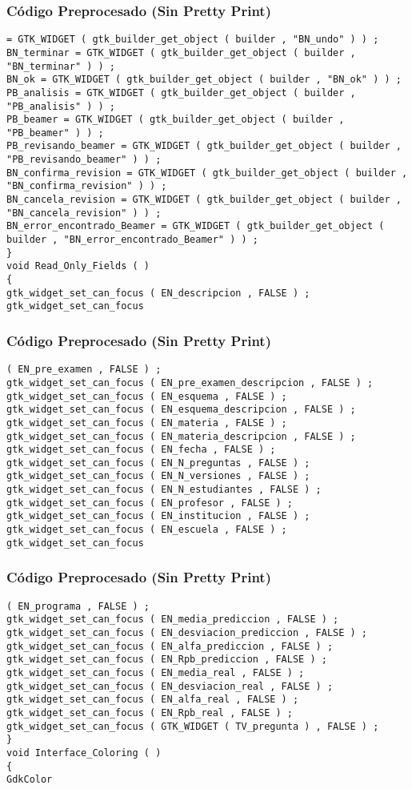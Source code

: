 \documentclass{beamer}
\begin{document}
\begin{frame}[fragile]
\frametitle{C\'odigo Preprocesado (Sin Pretty Print)}
\begin{lstlisting}[style=CStyle]
= GTK_WIDGET ( gtk_builder_get_object ( builder , "BN_undo" ) ) ; 
BN_terminar = GTK_WIDGET ( gtk_builder_get_object ( builder , "BN_terminar" ) ) ; 
BN_ok = GTK_WIDGET ( gtk_builder_get_object ( builder , "BN_ok" ) ) ; 
PB_analisis = GTK_WIDGET ( gtk_builder_get_object ( builder , "PB_analisis" ) ) ; 
PB_beamer = GTK_WIDGET ( gtk_builder_get_object ( builder , "PB_beamer" ) ) ; 
PB_revisando_beamer = GTK_WIDGET ( gtk_builder_get_object ( builder , "PB_revisando_beamer" ) ) ; 
BN_confirma_revision = GTK_WIDGET ( gtk_builder_get_object ( builder , "BN_confirma_revision" ) ) ; 
BN_cancela_revision = GTK_WIDGET ( gtk_builder_get_object ( builder , "BN_cancela_revision" ) ) ; 
BN_error_encontrado_Beamer = GTK_WIDGET ( gtk_builder_get_object ( builder , "BN_error_encontrado_Beamer" ) ) ; 
} 
void Read_Only_Fields ( ) 
{ 
gtk_widget_set_can_focus ( EN_descripcion , FALSE ) ; 
gtk_widget_set_can_focus \end{lstlisting}
\end{frame}
\begin{frame}[fragile]
\frametitle{C\'odigo Preprocesado (Sin Pretty Print)}
\begin{lstlisting}[style=CStyle]
( EN_pre_examen , FALSE ) ; 
gtk_widget_set_can_focus ( EN_pre_examen_descripcion , FALSE ) ; 
gtk_widget_set_can_focus ( EN_esquema , FALSE ) ; 
gtk_widget_set_can_focus ( EN_esquema_descripcion , FALSE ) ; 
gtk_widget_set_can_focus ( EN_materia , FALSE ) ; 
gtk_widget_set_can_focus ( EN_materia_descripcion , FALSE ) ; 
gtk_widget_set_can_focus ( EN_fecha , FALSE ) ; 
gtk_widget_set_can_focus ( EN_N_preguntas , FALSE ) ; 
gtk_widget_set_can_focus ( EN_N_versiones , FALSE ) ; 
gtk_widget_set_can_focus ( EN_N_estudiantes , FALSE ) ; 
gtk_widget_set_can_focus ( EN_profesor , FALSE ) ; 
gtk_widget_set_can_focus ( EN_institucion , FALSE ) ; 
gtk_widget_set_can_focus ( EN_escuela , FALSE ) ; 
gtk_widget_set_can_focus \end{lstlisting}
\end{frame}
\begin{frame}[fragile]
\frametitle{C\'odigo Preprocesado (Sin Pretty Print)}
\begin{lstlisting}[style=CStyle]
( EN_programa , FALSE ) ; 
gtk_widget_set_can_focus ( EN_media_prediccion , FALSE ) ; 
gtk_widget_set_can_focus ( EN_desviacion_prediccion , FALSE ) ; 
gtk_widget_set_can_focus ( EN_alfa_prediccion , FALSE ) ; 
gtk_widget_set_can_focus ( EN_Rpb_prediccion , FALSE ) ; 
gtk_widget_set_can_focus ( EN_media_real , FALSE ) ; 
gtk_widget_set_can_focus ( EN_desviacion_real , FALSE ) ; 
gtk_widget_set_can_focus ( EN_alfa_real , FALSE ) ; 
gtk_widget_set_can_focus ( EN_Rpb_real , FALSE ) ; 
gtk_widget_set_can_focus ( GTK_WIDGET ( TV_pregunta ) , FALSE ) ; 
} 
void Interface_Coloring ( ) 
{ 
GdkColor \end{lstlisting}
\end{frame}
\end{document}
